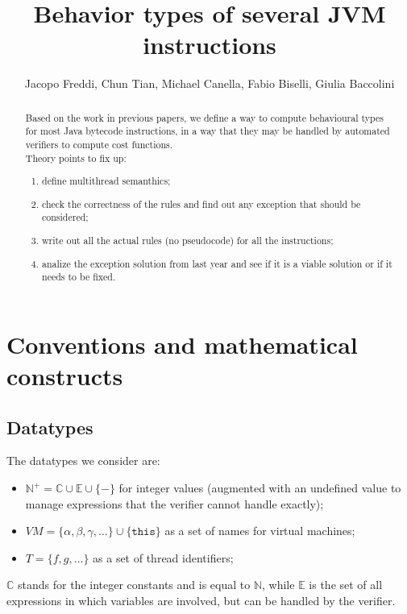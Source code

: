 \documentclass{amsart}
\newcommand{\N}{\mathbb{N}}
\newcommand{\E}{\mathbb{E}}
\newcommand{\C}{\mathbb{C}}
\newcommand{\Int}{\N^+}
\numberwithin{equation}{section}
\theoremstyle{plain} %
\theoremstyle{definition}
\theoremstyle{remark}
\begin{document}
\title{Behavior types of several JVM instructions}
\author{Jacopo Freddi, Chun Tian, Michael Canella, Fabio Biselli, Giulia Baccolini}




\maketitle

\begin{abstract}
Based on the work in previous papers, we define a way to compute behavioural types for most Java bytecode instructions, in a way that they may be handled by automated verifiers to compute cost functions.\\

Theory points to fix up:
\begin{enumerate}
\item define multithread semanthics;
\item check the correctness of the rules and find out any exception that should be considered;
\item write out all the actual rules (no pseudocode) for all the instructions;
\item analize the exception solution from last year and see if it is a viable solution or if it needs to be fixed.
\end{enumerate}

\end{abstract}


\section{Conventions and mathematical constructs}


\subsection{Datatypes}
The datatypes we consider are:
\begin{itemize}
\item $\Int{} = \C{} \cup \E{} \cup \{-\}$ for integer values (augmented with an undefined value to manage expressions that the verifier cannot handle exactly);
\item $VM = \{\alpha, \beta, \gamma, \dots\} \cup \{\texttt{this}\}$ as a set of names for virtual machines;
\item $T = \{f, g, \dots\}$ as a set of thread identifiers;
\end{itemize}
$\C{}$ stands for the integer constants and is equal to $\N{}$, while $\E{}$ is the set of all expressions in which variables are involved, but can be handled by the verifier.
\end{document}

